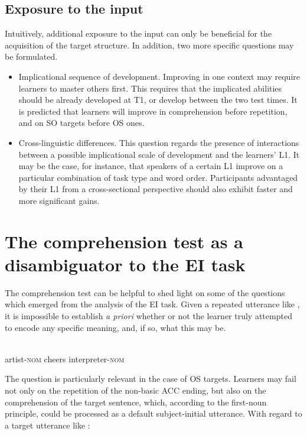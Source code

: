 \subsection{Exposure to the input}\label{sec:06:1.5}

Intuitively, additional exposure to the input can only be beneficial for the acquisition of the target structure. In addition, two more specific questions may be formulated. 

\begin{itemize}
    \item Implicational sequence of development. Improving in one context may require learners to master others first. This requires that the implicated abilities should be already developed at T1, or develop between the two test times. It is predicted that learners will improve in comprehension before repetition, and on SO targets before OS ones.
    \item Cross-linguistic differences. This question regards the presence of interactions between a possible implicational scale of development and the learners' L1. It may be the case, for instance, that speakers of a certain L1 improve on a particular combination of task type and word order. Participants advantaged by their L1 from a cross-sectional perspective should also exhibit faster and more significant gains.
\end{itemize}

\section{The comprehension test as a disambiguator to the EI task}\label{sec:06:2}

The comprehension test can be helpful to shed light on some of the questions which emerged from the analysis of the EI task. Given a repeated utterance like , it is impossible to establish \textit{a priori} whether or not the learner truly attempted to encode any specific meaning, and, if so, what this may be. 

\ea%
    \label{ex:06:1}
    \\
            artist-\textsc{nom}  cheers    interpreter-\textsc{nom}\\
    \z

The question is particularly relevant in the case of OS targets. Learners may fail not only on the repetition of the non-basic ACC ending, but also on the comprehension of the target sentence, which, according to the first-noun principle, could be processed as a default subject-initial utterance. With regard to a target utterance like : 

